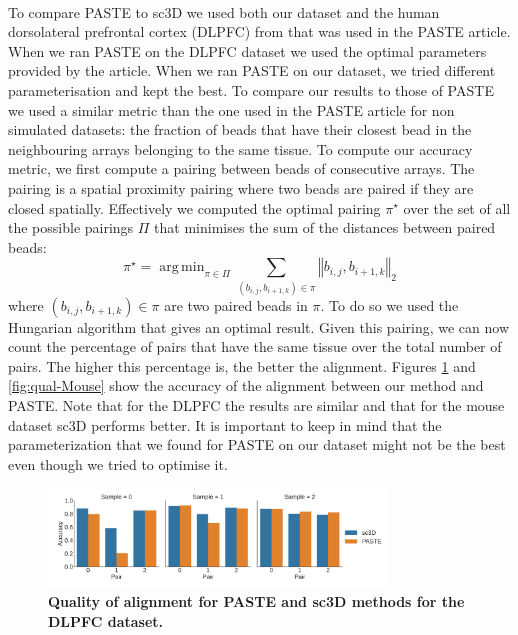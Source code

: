 \documentclass[10pt,a4paper]{article}
\DeclareMathOperator*{\argmin}{arg\,min}
\begin{document}
\paragraph{}To compare PASTE to sc3D we used both our dataset and the human dorsolateral prefrontal cortex (DLPFC) from \cite{Maynard:2021} that was used in the PASTE article.
When we ran PASTE on the DLPFC dataset we used the optimal parameters provided by the article.
When we ran PASTE on our dataset, we tried different parameterisation and kept the best.
To compare our results to those of PASTE we used a similar metric than the one used in the PASTE article for non simulated datasets: the fraction of beads that have their closest bead in the neighbouring arrays belonging to the same tissue.
To compute our accuracy metric, we first compute a pairing between beads of consecutive arrays.
The pairing is a spatial proximity pairing where two beads are paired if they are closed spatially.
Effectively we computed the optimal pairing \(\pi^\star\) over the set of all the possible pairings \(\Pi\) that minimises the sum of the distances between paired beads:
\begin{equation}
\pi^\star = \argmin_{\pi\in \Pi}\sum_{(b_{i,j}, b_{i+1,k})\in \pi} \left\Vert b_{i,j}, b_{i+1,k}\right\Vert_2
\end{equation}
where \((b_{i,j}, b_{i+1,k})\in \pi\) are two paired beads in \(\pi\). To do so we used the Hungarian algorithm that gives an optimal result.
Given this pairing, we can now count the percentage of pairs that have the same tissue over the total number of pairs. The higher this percentage is, the better the alignment.
Figures \ref{fig:qual-DLPFC} and \ref{fig:qual-Mouse} show the accuracy of the alignment between our method and PASTE.
Note that for the DLPFC the results are similar and that for the mouse dataset sc3D performs better.
It is important to keep in mind that the parameterization that we found for PASTE on our dataset might not be the best even though we tried to optimise it.
\begin{figure}
\center
\includegraphics[width=0.8\textwidth]{figures/sc3D_vs_PASTE_DLPFC}
\caption{\textbf{Quality of alignment for PASTE and sc3D methods for the DLPFC dataset.}}\label{fig:qual-DLPFC}
\end{figure}
\end{document}
